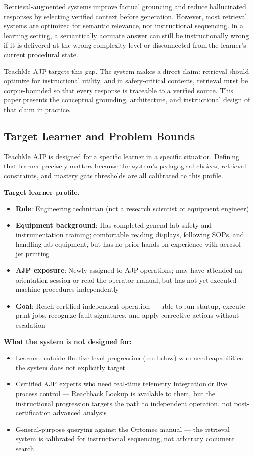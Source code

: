 \documentclass[11pt,letterpaper]{article}
\begin{document}
Retrieval-augmented systems improve factual grounding and reduce hallucinated responses by selecting verified context before generation. However, most retrieval systems are optimized for semantic relevance, not instructional sequencing. In a learning setting, a semantically accurate answer can still be instructionally wrong if it is delivered at the wrong complexity level or disconnected from the learner's current procedural state.

TeachMe AJP targets this gap. The system makes a direct claim: retrieval should optimize for instructional utility, and in safety-critical contexts, retrieval must be corpus-bounded so that every response is traceable to a verified source. This paper presents the conceptual grounding, architecture, and instructional design of that claim in practice.

\subsection{Target Learner and Problem Bounds}
\label{sec:target-learner}

TeachMe AJP is designed for a specific learner in a specific situation. Defining that learner precisely matters because the system's pedagogical choices, retrieval constraints, and mastery gate thresholds are all calibrated to this profile.

\textbf{Target learner profile:}
\begin{itemize}
  \item \textbf{Role}: Engineering technician (not a research scientist or equipment engineer)
  \item \textbf{Equipment background}: Has completed general lab safety and instrumentation training; comfortable reading displays, following SOPs, and handling lab equipment, but has no prior hands-on experience with aerosol jet printing
  \item \textbf{AJP exposure}: Newly assigned to AJP operations; may have attended an orientation session or read the operator manual, but has not yet executed machine procedures independently
  \item \textbf{Goal}: Reach certified independent operation --- able to run startup, execute print jobs, recognize fault signatures, and apply corrective actions without escalation
\end{itemize}

\textbf{What the system is not designed for:}
\begin{itemize}
  \item Learners outside the five-level progression (see below) who need capabilities the system does not explicitly target
  \item Certified AJP experts who need real-time telemetry integration or live process control --- Reachback Lookup is available to them, but the instructional progression targets the path to independent operation, not post-certification advanced analysis
  \item General-purpose querying against the Optomec manual --- the retrieval system is calibrated for instructional sequencing, not arbitrary document search
\end{itemize}
\end{document}
